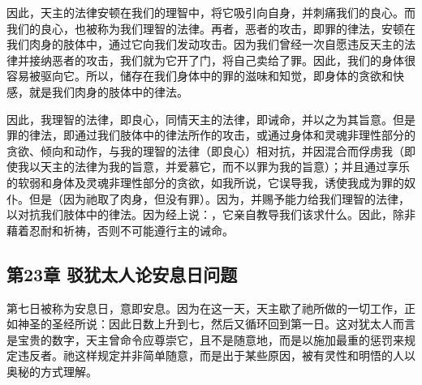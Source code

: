 因此，天主的法律安顿在我们的理智中，将它吸引向自身，并刺痛我们的良心。而我们的良心，也被称为我们理智的法律。再者，恶者的攻击，即罪的律法，安顿在我们肉身的肢体中，通过它向我们发动攻击。因为我们曾经一次自愿违反天主的法律并接纳恶者的攻击，我们就为它开了门，将自己卖给了罪。因此，我们的身体很容易被驱向它。所以，储存在我们身体中的罪的滋味和知觉，即身体的贪欲和快感，就是我们肉身的肢体中的律法。\par

因此，我理智的法律，即良心，同情天主的法律，即诫命，并以之为其旨意。但是罪的律法，即通过我们肢体中的律法所作的攻击，或通过身体和灵魂非理性部分的贪欲、倾向和动作，与我的理智的法律（即良心）相对抗，并因混合而俘虏我（即使我以天主的法律为我的旨意，并爱慕它，而不以罪为我的旨意）；并且通过享乐的软弱和身体及灵魂非理性部分的贪欲，如我所说，它误导我，诱使我成为罪的奴仆。但是（因为祂取了肉身，但没有罪）。因为，并赐予能力给我们理智的法律，以对抗我们肢体中的律法。因为经上说：，它亲自教导我们该求什么。因此，除非藉着忍耐和祈祷，否则不可能遵行主的诫命。\par


\subsection{第23章 驳犹太人论安息日问题}

第七日被称为安息日，意即安息。因为在这一天，天主歇了祂所做的一切工作，正如神圣的圣经所说：因此日数上升到七，然后又循环回到第一日。这对犹太人而言是宝贵的数字，天主曾命令应尊崇它，且不是随意地，而是以施加最重的惩罚来规定违反者。祂这样规定并非简单随意，而是出于某些原因，被有灵性和明悟的人以奥秘的方式理解。\par


